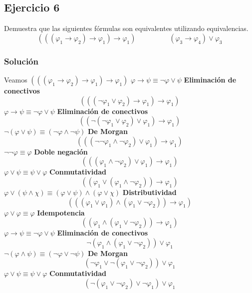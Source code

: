 \documentclass[a4paper]{article}
\begin{document}
\subsection*{Ejercicio 6}
Demuestra que las siguientes fórmulas son equivalentes utilizando equivalencias.
    \[
        ((( \varphi_1 \rightarrow \varphi_2) \rightarrow \varphi_1) \rightarrow \varphi_1) \hspace{2cm} (\varphi_3 \rightarrow \varphi_4) \lor \varphi_3
    \]
\subsubsection*{Solución}
Veamos $((( \varphi_1 \rightarrow \varphi_2) \rightarrow \varphi_1) \rightarrow \varphi_1)$
    \newline
    $\varphi \rightarrow \psi \equiv \neg \varphi \lor \psi$ \textbf{Eliminación de conectivos}
    \[
        ((( \neg \varphi_1 \lor \varphi_2) \rightarrow \varphi_1) \rightarrow \varphi_1)
    \]
    $\varphi \rightarrow \psi \equiv \neg \varphi \lor \psi$ \textbf{Eliminación de conectivos}
    \[
        ((\neg ( \neg \varphi_1 \lor \varphi_2) \lor \varphi_1) \rightarrow \varphi_1)
    \]
    $\neg(\varphi \lor \psi) \equiv (\neg \varphi \land \neg \psi)$ \textbf{De Morgan}
    \[
        (((\neg\neg \varphi_1 \land  \neg \varphi_2) \lor \varphi_1) \rightarrow \varphi_1)
    \]
    $\neg \neg \varphi \equiv \varphi$ \textbf{Doble negación}
    \[
        (((\varphi_1 \land  \neg \varphi_2) \lor \varphi_1) \rightarrow \varphi_1)
    \]
    $\varphi \lor \psi \equiv \psi \lor \varphi$ \textbf{Conmutatividad}
    \[
        ((\varphi_1 \lor (\varphi_1 \land  \neg \varphi_2)) \rightarrow \varphi_1)
    \]
    $\varphi \lor (\psi \land \chi) \equiv (\varphi \lor \psi) \land (\varphi \lor \chi)$ \textbf{Distributividad}
    \[
        (((\varphi_1 \lor \varphi_1) \land  (\varphi_1 \lor \neg \varphi_2)) \rightarrow \varphi_1)
    \]
    $\varphi \lor \varphi \equiv \varphi$ \textbf{Idempotencia}
    \[
        ((\varphi_1 \land  (\varphi_1 \lor \neg \varphi_2)) \rightarrow \varphi_1)
    \]
    $\varphi \rightarrow \psi \equiv \neg \varphi \lor \psi$ \textbf{Eliminación de conectivos}
    \[
        \neg (\varphi_1 \land  (\varphi_1 \lor \neg \varphi_2)) \lor \varphi_1
    \]
    $\neg(\varphi \land \psi) \equiv (\neg \varphi \lor \neg \psi)$ \textbf{De Morgan}
    \[
        (\neg \varphi_1 \lor \neg (\varphi_1 \lor \neg \varphi_2)) \lor \varphi_1
    \]
    $\varphi \lor \psi \equiv \psi \lor \varphi$ \textbf{Conmutatividad}
    \[
        (\neg (\varphi_1 \lor \neg \varphi_2) \lor \neg \varphi_1) \lor \varphi_1
    \]
\end{document}
